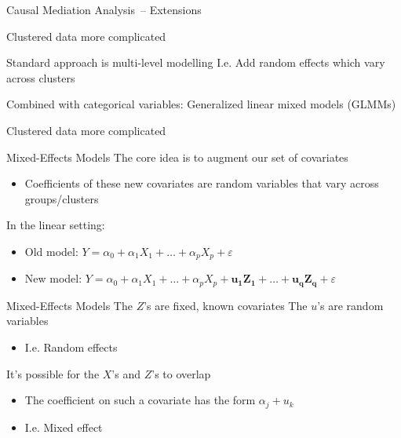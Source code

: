 \documentclass[14pt]{beamer}
\newcommand{\CMA}{Causal Mediation Analysis}
\newcommand{\GLMMs}{Mixed-Effects Models}
\begin{document}
\begin{frame}{\CMA\ -- Extensions}
    \begin{outline}
        \1 Clustered data more complicated \newline

        \1 Standard approach is multi-level modelling
            \2 I.e. Add random effects which vary across clusters \newline

        \1 Combined with categorical variables: 
            \2 Generalized linear mixed models (GLMMs)
    \end{outline}
    Clustered data more complicated \newline
\end{frame}


\begin{frame}{\GLMMs}
    The core idea is to augment our set of covariates
    \begin{itemize}
        \item Coefficients of these new covariates are random variables that vary across groups/clusters \newline
    \end{itemize}

    In the linear setting:
    \begin{itemize}
        \item Old model: $Y = \alpha_0 + \alpha_1 X_1 + \ldots + \alpha_p X_p + \varepsilon$
        \item New model: $Y = \alpha_0 + \alpha_1 X_1 + \ldots + \alpha_p X_p + \mathbf{u_1 Z_1 + \ldots + u_q Z_q} + \varepsilon$ \newline
    \end{itemize}

    


\end{frame}

\begin{frame}{\GLMMs}
    The $Z$'s are fixed, known covariates
    The $u$'s are random variables
    \begin{itemize}
        \item I.e. Random effects \newline
    \end{itemize}

    It's possible for the $X$'s and $Z$'s to overlap
    \begin{itemize}
        \item The coefficient on such a covariate has the form $\alpha_j + u_{k}$
        \item I.e. Mixed effect
    \end{itemize}

\end{frame}
\end{document}
